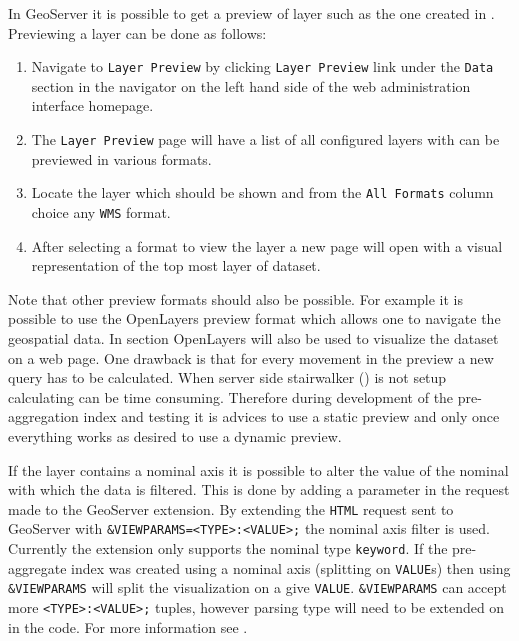 
In GeoServer it is possible to get a preview of layer such as the one created in . Previewing a layer can be done as follows:

\begin{enumerate}
	\item Navigate to \lstinline|Layer Preview| by clicking \lstinline|Layer Preview| link under the \lstinline|Data| section in the navigator on the left hand side of the web administration interface homepage.
	\item The \lstinline|Layer Preview| page will have a list of all configured layers with can be previewed in various formats.
	\item Locate the layer which should be shown and from the \lstinline|All Formats| column choice any \lstinline|WMS| format.
	\item After selecting a format to view the layer a new page will open with a visual representation of the top most layer of dataset.
\end{enumerate}

Note that other preview formats should also be possible. For example it is possible to use the OpenLayers preview format which allows one to navigate the geospatial data. In section  OpenLayers will also be used to visualize the dataset on a web page. One drawback is that for every movement in the preview a new query has to be calculated. When server side stairwalker () is not setup calculating can be time consuming. Therefore during development of the pre-aggregation index and testing it is advices to use a static preview and only once everything works as desired to use a dynamic preview.

If the layer contains a nominal axis it is possible to alter the value of the nominal with which the data is filtered. This is done by adding a parameter in the request made to the GeoServer extension. By extending the \lstinline|HTML| request sent to GeoServer with \lstinline|&VIEWPARAMS=<TYPE>:<VALUE>;| the nominal axis filter is used. Currently the extension only supports the nominal type \lstinline|keyword|. If the pre-aggregate index was created using a nominal axis (splitting on \lstinline|VALUE|s) then using \lstinline|&VIEWPARAMS| will split the visualization on a give \lstinline|VALUE|. \lstinline|&VIEWPARAMS| can accept more \lstinline|<TYPE>:<VALUE>;| tuples, however parsing type will need to be extended on in the code. For more information see .

